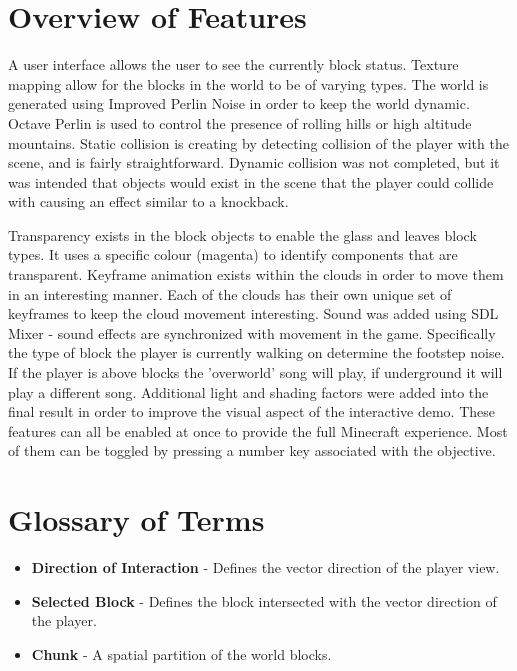 \documentclass{book}
\begin{document}
\section{Overview of Features}
A user interface allows the user to see the currently block status.  Texture mapping allow for the blocks in the world to be of varying types.  The world is generated using Improved Perlin Noise in order to keep the world dynamic.  Octave Perlin is used to control the presence of rolling hills or high altitude mountains.  Static collision is creating by detecting collision of the player with the scene, and is fairly straightforward.  Dynamic collision was not completed, but it was intended that objects would exist in the scene that the player could collide with causing an effect similar to a knockback.  

Transparency exists in the block objects to enable the glass and leaves block types.  It uses a specific colour (magenta) to identify components that are transparent.  Keyframe animation exists within the clouds in order to move them in an interesting manner.  Each of the clouds has their own unique set of keyframes to keep the cloud movement interesting.  Sound was added using SDL Mixer - sound effects are synchronized with movement in the game.  Specifically the type of block the player is currently walking on determine the footstep noise.  If the player is above blocks the 'overworld' song will play, if underground it will play a different song. Additional light and shading factors were added into the final result in order to improve the visual aspect of the interactive demo.  These features can all be enabled at once to provide the full Minecraft experience. Most of them can be toggled by pressing a number key associated with the objective. 

\section{Glossary of Terms}
\begin{itemize}
\item \textbf{Direction of Interaction} - Defines the vector direction of the player view.
\item \textbf{Selected Block} - Defines the block intersected with the vector direction of the player.
\item \textbf{Chunk} - A spatial partition of the world blocks.
\end{itemize}

\end{document}
